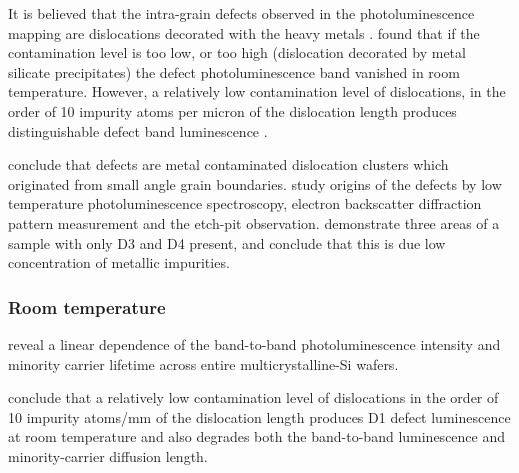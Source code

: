 It is believed that the intra-grain defects observed in the photoluminescence mapping are dislocations decorated with the heavy metals \cite{sugimoto06}. \cite{tarasov01} found that if the contamination level is too low, or too high (dislocation decorated by metal silicate precipitates) the defect photoluminescence band vanished in room temperature. However, a relatively low contamination level of dislocations, in the order of 10 impurity atoms per micron of the dislocation length produces distinguishable defect band luminescence \cite{tarasov01,kitler02}. 

\cite{sugimoto07} conclude that defects are metal contaminated dislocation clusters which originated from small angle grain boundaries. \cite{sugimoto07} study origins of the defects by low temperature photoluminescence spectroscopy, electron backscatter diffraction pattern measurement and the etch-pit observation. \cite{arguirov07} demonstrate three areas of a sample with only D3 and D4 present, and conclude that this is due low concentration of metallic impurities.


\subsubsection{Room temperature}


\cite{tarasov00} reveal a linear dependence of the band-to-band photoluminescence intensity and minority carrier lifetime across entire multicrystalline-Si wafers.

\cite{kitler02} conclude that a relatively low contamination level of dislocations in the order of 10 impurity atoms/mm of the dislocation length produces D1 defect luminescence at room temperature and also degrades both the band-to-band luminescence and minority-carrier diffusion length.